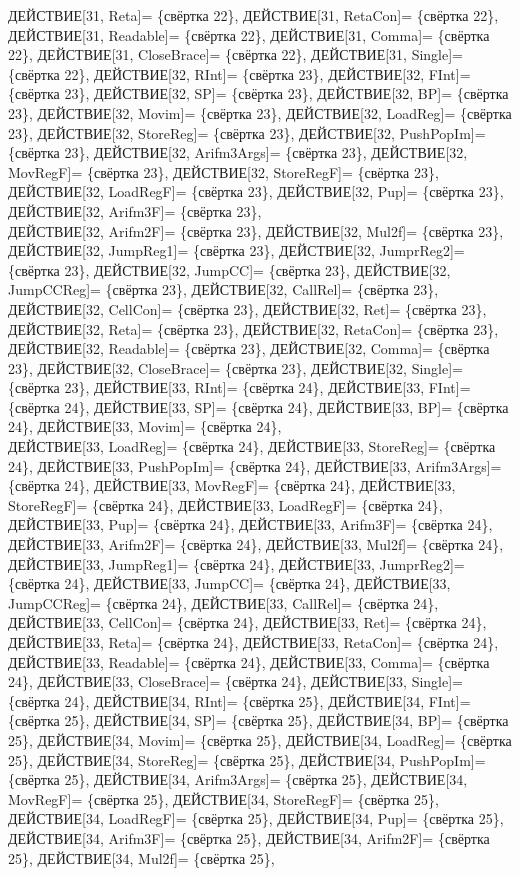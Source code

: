 \documentclass[a0]{a0poster}
\begin{document}
ДЕЙСТВИЕ[31, Reta]= \{свёртка 22\}, ДЕЙСТВИЕ[31, RetaCon]= \{свёртка 22\}, ДЕЙСТВИЕ[31, Readable]= \{свёртка 22\}, ДЕЙСТВИЕ[31, Comma]= \{свёртка 22\}, ДЕЙСТВИЕ[31, CloseBrace]= \{свёртка 22\}, ДЕЙСТВИЕ[31, Single]= \{свёртка 22\}, ДЕЙСТВИЕ[32, RInt]= \{свёртка 23\}, ДЕЙСТВИЕ[32, FInt]= \{свёртка 23\}, ДЕЙСТВИЕ[32, SP]= \{свёртка 23\}, ДЕЙСТВИЕ[32, BP]= \{свёртка 23\}, ДЕЙСТВИЕ[32, Movim]= \{свёртка 23\}, ДЕЙСТВИЕ[32, LoadReg]= \{свёртка 23\}, ДЕЙСТВИЕ[32, StoreReg]= \{свёртка 23\}, ДЕЙСТВИЕ[32, PushPopIm]= \{свёртка 23\}, ДЕЙСТВИЕ[32, Arifm3Args]= \{свёртка 23\}, ДЕЙСТВИЕ[32, MovRegF]= \{свёртка 23\}, ДЕЙСТВИЕ[32, StoreRegF]= \{свёртка 23\}, ДЕЙСТВИЕ[32, LoadRegF]= \{свёртка 23\}, ДЕЙСТВИЕ[32, Pup]= \{свёртка 23\}, ДЕЙСТВИЕ[32, Arifm3F]= \{свёртка 23\}, \\
ДЕЙСТВИЕ[32, Arifm2F]= \{свёртка 23\}, ДЕЙСТВИЕ[32, Mul2f]= \{свёртка 23\}, ДЕЙСТВИЕ[32, JumpReg1]= \{свёртка 23\}, ДЕЙСТВИЕ[32, JumprReg2]= \{свёртка 23\}, ДЕЙСТВИЕ[32, JumpCC]= \{свёртка 23\}, ДЕЙСТВИЕ[32, JumpCCReg]= \{свёртка 23\}, ДЕЙСТВИЕ[32, CallRel]= \{свёртка 23\}, ДЕЙСТВИЕ[32, CellCon]= \{свёртка 23\}, ДЕЙСТВИЕ[32, Ret]= \{свёртка 23\}, ДЕЙСТВИЕ[32, Reta]= \{свёртка 23\}, ДЕЙСТВИЕ[32, RetaCon]= \{свёртка 23\}, ДЕЙСТВИЕ[32, Readable]= \{свёртка 23\}, ДЕЙСТВИЕ[32, Comma]= \{свёртка 23\}, ДЕЙСТВИЕ[32, CloseBrace]= \{свёртка 23\}, ДЕЙСТВИЕ[32, Single]= \{свёртка 23\}, ДЕЙСТВИЕ[33, RInt]= \{свёртка 24\}, ДЕЙСТВИЕ[33, FInt]= \{свёртка 24\}, ДЕЙСТВИЕ[33, SP]= \{свёртка 24\}, ДЕЙСТВИЕ[33, BP]= \{свёртка 24\}, ДЕЙСТВИЕ[33, Movim]= \{свёртка 24\}, \\
ДЕЙСТВИЕ[33, LoadReg]= \{свёртка 24\}, ДЕЙСТВИЕ[33, StoreReg]= \{свёртка 24\}, ДЕЙСТВИЕ[33, PushPopIm]= \{свёртка 24\}, ДЕЙСТВИЕ[33, Arifm3Args]= \{свёртка 24\}, ДЕЙСТВИЕ[33, MovRegF]= \{свёртка 24\}, ДЕЙСТВИЕ[33, StoreRegF]= \{свёртка 24\}, ДЕЙСТВИЕ[33, LoadRegF]= \{свёртка 24\}, ДЕЙСТВИЕ[33, Pup]= \{свёртка 24\}, ДЕЙСТВИЕ[33, Arifm3F]= \{свёртка 24\}, ДЕЙСТВИЕ[33, Arifm2F]= \{свёртка 24\}, ДЕЙСТВИЕ[33, Mul2f]= \{свёртка 24\}, ДЕЙСТВИЕ[33, JumpReg1]= \{свёртка 24\}, ДЕЙСТВИЕ[33, JumprReg2]= \{свёртка 24\}, ДЕЙСТВИЕ[33, JumpCC]= \{свёртка 24\}, ДЕЙСТВИЕ[33, JumpCCReg]= \{свёртка 24\}, ДЕЙСТВИЕ[33, CallRel]= \{свёртка 24\}, ДЕЙСТВИЕ[33, CellCon]= \{свёртка 24\}, ДЕЙСТВИЕ[33, Ret]= \{свёртка 24\}, ДЕЙСТВИЕ[33, Reta]= \{свёртка 24\}, ДЕЙСТВИЕ[33, RetaCon]= \{свёртка 24\}, \\
ДЕЙСТВИЕ[33, Readable]= \{свёртка 24\}, ДЕЙСТВИЕ[33, Comma]= \{свёртка 24\}, ДЕЙСТВИЕ[33, CloseBrace]= \{свёртка 24\}, ДЕЙСТВИЕ[33, Single]= \{свёртка 24\}, ДЕЙСТВИЕ[34, RInt]= \{свёртка 25\}, ДЕЙСТВИЕ[34, FInt]= \{свёртка 25\}, ДЕЙСТВИЕ[34, SP]= \{свёртка 25\}, ДЕЙСТВИЕ[34, BP]= \{свёртка 25\}, ДЕЙСТВИЕ[34, Movim]= \{свёртка 25\}, ДЕЙСТВИЕ[34, LoadReg]= \{свёртка 25\}, ДЕЙСТВИЕ[34, StoreReg]= \{свёртка 25\}, ДЕЙСТВИЕ[34, PushPopIm]= \{свёртка 25\}, ДЕЙСТВИЕ[34, Arifm3Args]= \{свёртка 25\}, ДЕЙСТВИЕ[34, MovRegF]= \{свёртка 25\}, ДЕЙСТВИЕ[34, StoreRegF]= \{свёртка 25\}, ДЕЙСТВИЕ[34, LoadRegF]= \{свёртка 25\}, ДЕЙСТВИЕ[34, Pup]= \{свёртка 25\}, ДЕЙСТВИЕ[34, Arifm3F]= \{свёртка 25\}, ДЕЙСТВИЕ[34, Arifm2F]= \{свёртка 25\}, ДЕЙСТВИЕ[34, Mul2f]= \{свёртка 25\}, \\
\end{document}
